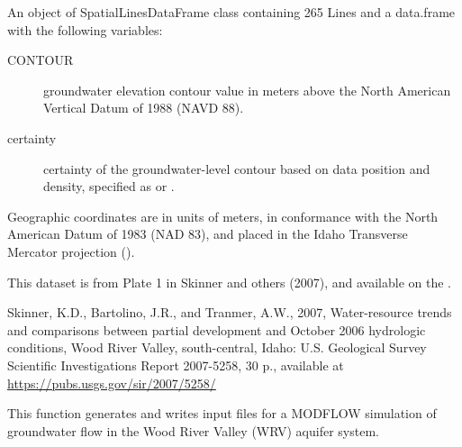 \documentclass[a4paper]{book}
\begin{document}
%
\begin{Format}
An object of SpatialLinesDataFrame class containing 265 Lines and a
data.frame with the following variables:
\begin{description}

\item[CONTOUR] groundwater elevation contour value in meters above the
North American Vertical Datum of 1988 (NAVD 88).
\item[certainty] certainty of the groundwater-level contour based on
data position and density, specified as  or .

\end{description}

Geographic coordinates are in units of meters, in conformance with the
North American Datum of 1983 (NAD 83), and placed in the
Idaho Transverse Mercator projection ().
\end{Format}
%
\begin{Source}\relax
This dataset is from Plate 1 in Skinner and others (2007), and available on the
.
\end{Source}
%
\begin{References}\relax
Skinner, K.D., Bartolino, J.R., and Tranmer, A.W., 2007,
Water-resource trends and comparisons between partial development and
October 2006 hydrologic conditions, Wood River Valley, south-central, Idaho:
U.S. Geological Survey Scientific Investigations Report 2007-5258, 30 p.,
available at \url{https://pubs.usgs.gov/sir/2007/5258/}
\end{References}
%
\begin{Examples}
\end{Examples}
%
\begin{Description}\relax
This function generates and writes input files for a MODFLOW simulation of
groundwater flow in the Wood River Valley (WRV) aquifer system.
\end{Description}
\end{document}
